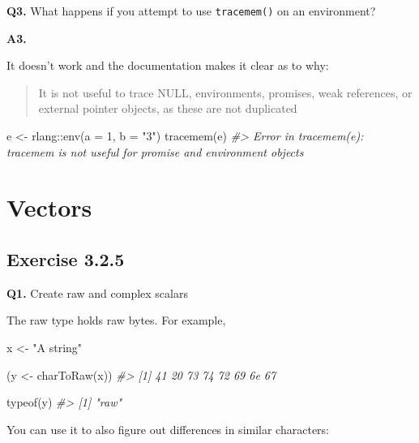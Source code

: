 \documentclass[
]{book}
\newenvironment{Shaded}{\begin{snugshade}}{\end{snugshade}}
\newcommand{\AttributeTok}[1]{\textcolor[rgb]{0.77,0.63,0.00}{#1}}
\newcommand{\CommentTok}[1]{\textcolor[rgb]{0.56,0.35,0.01}{\textit{#1}}}
\newcommand{\DecValTok}[1]{\textcolor[rgb]{0.00,0.00,0.81}{#1}}
\newcommand{\FunctionTok}[1]{\textcolor[rgb]{0.00,0.00,0.00}{#1}}
\newcommand{\NormalTok}[1]{#1}
\newcommand{\OtherTok}[1]{\textcolor[rgb]{0.56,0.35,0.01}{#1}}
\newcommand{\SpecialCharTok}[1]{\textcolor[rgb]{0.00,0.00,0.00}{#1}}
\newcommand{\StringTok}[1]{\textcolor[rgb]{0.31,0.60,0.02}{#1}}
\begin{document}
\textbf{Q3.} What happens if you attempt to use \texttt{tracemem()} on an environment?

\textbf{A3.}

It doesn't work and the documentation makes it clear as to why:

\begin{quote}
It is not useful to trace NULL, environments, promises, weak references, or external pointer objects, as these are not duplicated
\end{quote}

\begin{Shaded}
\begin{Highlighting}[]
\NormalTok{e }\OtherTok{\textless{}{-}}\NormalTok{ rlang}\SpecialCharTok{::}\FunctionTok{env}\NormalTok{(}\AttributeTok{a =} \DecValTok{1}\NormalTok{, }\AttributeTok{b =} \StringTok{"3"}\NormalTok{)}
\FunctionTok{tracemem}\NormalTok{(e)}
\CommentTok{\#\textgreater{} Error in tracemem(e): \textquotesingle{}tracemem\textquotesingle{} is not useful for promise and environment objects}
\end{Highlighting}
\end{Shaded}

\hypertarget{vectors}{%
\chapter{Vectors}\label{vectors}}

\hypertarget{exercise-3.2.5}{%
\section{Exercise 3.2.5}\label{exercise-3.2.5}}

\textbf{Q1.} Create raw and complex scalars

The raw type holds raw bytes. For example,

\begin{Shaded}
\begin{Highlighting}[]
\NormalTok{x }\OtherTok{\textless{}{-}} \StringTok{"A string"}

\NormalTok{(y }\OtherTok{\textless{}{-}} \FunctionTok{charToRaw}\NormalTok{(x))}
\CommentTok{\#\textgreater{} [1] 41 20 73 74 72 69 6e 67}

\FunctionTok{typeof}\NormalTok{(y)}
\CommentTok{\#\textgreater{} [1] "raw"}
\end{Highlighting}
\end{Shaded}

You can use it to also figure out differences in similar characters:
\end{document}
